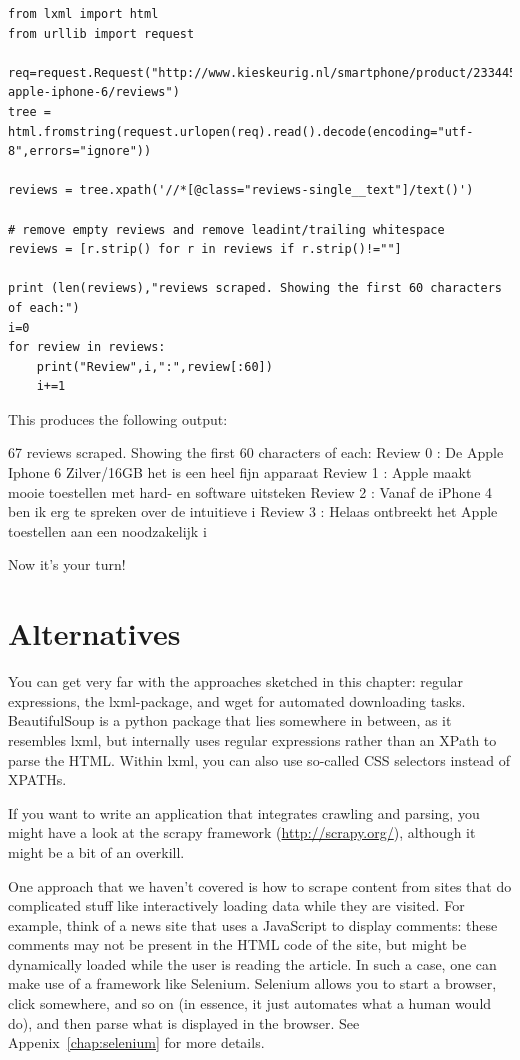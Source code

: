 \documentclass[a4paper,12pt]{book}
\begin{document}
\begin{lstlisting}
from lxml import html
from urllib import request

req=request.Request("http://www.kieskeurig.nl/smartphone/product/2334455-apple-iphone-6/reviews")
tree = html.fromstring(request.urlopen(req).read().decode(encoding="utf-8",errors="ignore"))        

reviews = tree.xpath('//*[@class="reviews-single__text"]/text()')

# remove empty reviews and remove leadint/trailing whitespace
reviews = [r.strip() for r in reviews if r.strip()!=""]

print (len(reviews),"reviews scraped. Showing the first 60 characters of each:")
i=0
for review in reviews:
    print("Review",i,":",review[:60])
    i+=1
\end{lstlisting}


This produces the following output:

\begin{lstlistingoutput}
67 reviews scraped. Showing the first 60 characters of each:
Review 0 : De Apple Iphone 6 Zilver/16GB het is een heel fijn apparaat 
Review 1 : Apple maakt mooie toestellen met hard- en software uitsteken
Review 2 : Vanaf de iPhone 4 ben ik erg te spreken over de intuitieve i
Review 3 : Helaas ontbreekt het Apple toestellen aan een noodzakelijk i
\end{lstlistingoutput}

Now it's your turn!


\section{Alternatives}
You can get very far with the approaches sketched in this chapter: regular expressions, the lxml-package, and wget for automated downloading tasks. BeautifulSoup is a python package that lies somewhere in between, as it resembles lxml, but internally uses regular expressions rather than an XPath to parse the HTML. Within lxml, you can also use so-called CSS selectors instead of XPATHs.

If you want to write an application that integrates crawling and parsing, you might have a look at the scrapy framework (\url{http://scrapy.org/}), although it might be a bit of an overkill.

One approach that we haven't covered is how to scrape content from sites that do complicated stuff like interactively loading data while they are visited. For example, think of a news site that uses a JavaScript to display comments: these comments may not be present in the HTML code of the site, but might be dynamically loaded while the user is reading the article. In such a case, one can make use of a framework like Selenium. Selenium allows you to start a browser, click somewhere, and so on (in essence, it just automates what a human would do), and then parse what is displayed in the browser. See Appenix~\ref{chap:selenium} for more details.
\end{document}

